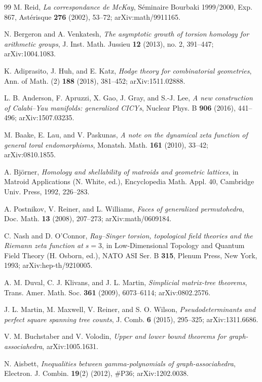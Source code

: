 \documentclass[11pt]{article}
\theoremstyle{definition}
\begin{document}
\begin{thebibliography}{99}
 M. Reid, \emph{La correspondance de McKay}, S\'eminaire Bourbaki 1999/2000, Exp. 867, Ast\'erisque \textbf{276} (2002), 53--72; arXiv:math/9911165.

 N. Bergeron and A. Venkatesh, \emph{The asymptotic growth of torsion homology for arithmetic groups}, J. Inst. Math. Jussieu \textbf{12} (2013), no. 2, 391--447; arXiv:1004.1083.

 K. Adiprasito, J. Huh, and E. Katz, \emph{Hodge theory for combinatorial geometries}, Ann. of Math. (2) \textbf{188} (2018), 381--452; arXiv:1511.02888.

 L. B. Anderson, F. Apruzzi, X. Gao, J. Gray, and S.-J. Lee, \emph{A new construction of Calabi--Yau manifolds: generalized CICYs}, Nuclear Phys. B \textbf{906} (2016), 441--496; arXiv:1507.03235.

 M. Baake, E. Lau, and V. Paskunas, \emph{A note on the dynamical zeta function of general toral endomorphisms}, Monatsh. Math. \textbf{161} (2010), 33--42; arXiv:0810.1855.

 A. Bj\"orner, \emph{Homology and shellability of matroids and geometric lattices}, in Matroid Applications (N. White, ed.), Encyclopedia Math. Appl. 40, Cambridge Univ. Press, 1992, 226--283.

 A. Postnikov, V. Reiner, and L. Williams, \emph{Faces of generalized permutohedra}, Doc. Math. \textbf{13} (2008), 207--273; arXiv:math/0609184.

 C. Nash and D. O'Connor, \emph{Ray--Singer torsion, topological field theories and the Riemann zeta function at $s=3$}, in Low-Dimensional Topology and Quantum Field Theory (H. Osborn, ed.), NATO ASI Ser. B \textbf{315}, Plenum Press, New York, 1993; arXiv:hep-th/9210005.

 A. M. Duval, C. J. Klivans, and J. L. Martin, \emph{Simplicial matrix-tree theorems}, Trans. Amer. Math. Soc. \textbf{361} (2009), 6073--6114; arXiv:0802.2576.

 J. L. Martin, M. Maxwell, V. Reiner, and S. O. Wilson, \emph{Pseudodeterminants and perfect square spanning tree counts}, J. Comb. \textbf{6} (2015), 295--325; arXiv:1311.6686.

 V. M. Buchstaber and V. Volodin, \emph{Upper and lower bound theorems for graph-associahedra}, arXiv:1005.1631.

 N. Aisbett, \emph{Inequalities between gamma-polynomials of graph-associahedra}, Electron. J. Combin. \textbf{19}(2) (2012), \#P36; arXiv:1202.0038.


\end{thebibliography}
\end{document}
